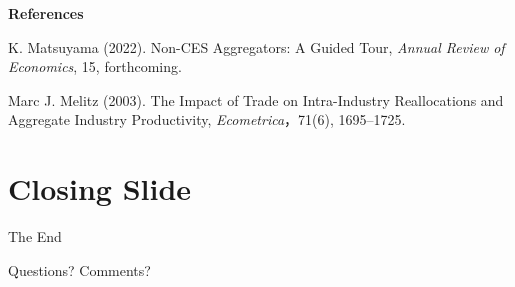 \documentclass[12pt, aspectratio=169]{beamer}
\begin{document}
\linespread{1}
\begin{frame}{\textbf{References}}
\linespread{1.5} 

\footnotesize

\begin{thebibliography}{99} 

		K. Matsuyama (2022). %
		\newblock Non-CES Aggregators: A Guided Tour, %
		\newblock \emph{Annual Review of Economics}, 15, forthcoming. %

		Marc J. Melitz (2003).
		\newblock The Impact of Trade on Intra-Industry Reallocations and Aggregate Industry Productivity,
		\newblock \emph{Ecometrica}，71(6), 1695--1725.
		
\end{thebibliography}

\end{frame}


\section*{Closing Slide}


\begin{frame}[plain] %
	\begin{center}
		{\Huge The End}
		
		\bigskip\bigskip 
		
		{\LARGE Questions? Comments?}
	\end{center}
\end{frame}

\end{document}
